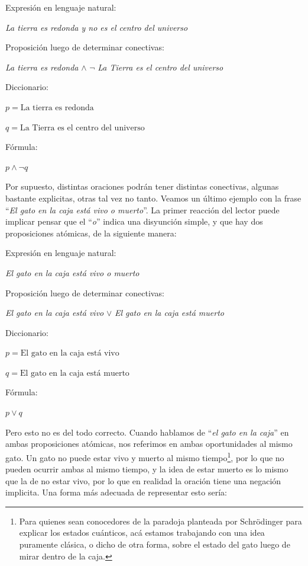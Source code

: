 \begin{example}
    \sindent Expresión en lenguaje natural:

    \dindent \textit{La tierra es redonda y no es el centro del universo}

    \sindent Proposición luego de determinar conectivas:

    \dindent \textit{La tierra es redonda} $\land$ $\lnot$ \textit{La Tierra es
    el centro del universo}

    \sindent Diccionario:

    \dindent $p = \text{La tierra es redonda}$

    \dindent $q = \text{La Tierra es el centro del universo}$


    \sindent Fórmula:

    \dindent $p \land \lnot q$
\end{example}

Por supuesto, distintas oraciones podrán tener distintas conectivas, algunas
bastante explicitas, otras tal vez no tanto. Veamos un último ejemplo con la
frase ``\textit{El gato en la caja está vivo o muerto}''. La primer reacción del
lector puede implicar pensar que el ``\textit{o}'' indica una disyunción simple,
y que hay dos proposiciones atómicas, de la siguiente manera:

\begin{example}
    \sindent Expresión en lenguaje natural:

    \dindent \textit{El gato en la caja está vivo o muerto}

    \sindent Proposición luego de determinar conectivas:

    \dindent \textit{El gato en la caja está vivo} $\lor$ \textit{El gato en la
    caja está muerto}

    \sindent Diccionario:

    \dindent $p = \text{El gato en la caja está vivo}$

    \dindent $q = \text{El gato en la caja está muerto}$

    \sindent Fórmula:

    \dindent $p \lor q$
\end{example}

Pero esto no es del todo correcto. Cuando hablamos de ``\textit{el gato en la
caja}'' en ambas proposiciones atómicas, nos referimos en ambas oportunidades al
mismo gato. Un gato no puede estar vivo y muerto al mismo tiempo\footnote{ Para
quienes sean conocedores de la paradoja planteada por Schrödinger para explicar
los estados cuánticos, acá estamos trabajando con una idea puramente clásica, o
dicho de otra forma, sobre el estado del gato luego de mirar dentro de la caja.
}, por lo que no pueden ocurrir ambas al mismo tiempo, y la idea de estar muerto
es lo mismo que la de no estar vivo, por lo que en realidad la oración tiene una
negación implicita. Una forma más adecuada de representar esto sería:

